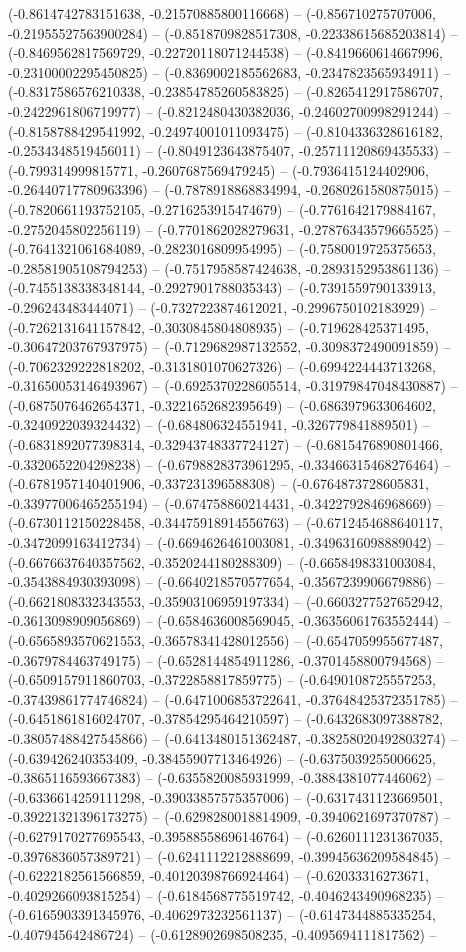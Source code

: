 (-0.8614742783151638, -0.21570885800116668) -- (-0.856710275707006, -0.21955527563900284) -- (-0.8518709828517308, -0.22338615685203814) -- (-0.8469562817569729, -0.22720118071244538) -- (-0.8419660614667996, -0.23100002295450825) -- (-0.8369002185562683, -0.2347823565934911) -- (-0.8317586576210338, -0.23854785260583825) -- (-0.8265412917586707, -0.2422961806719977) -- (-0.8212480430382036, -0.24602700998291244) -- (-0.8158788429541992, -0.24974001011093475) -- (-0.8104336328616182, -0.2534348519456011) -- (-0.8049123643875407, -0.25711120869435533) -- (-0.799314999815771, -0.2607687569479245) -- (-0.7936415124402906, -0.26440717780963396) -- (-0.7878918868834994, -0.2680261580875015) -- (-0.7820661193752105, -0.2716253915474679) -- (-0.7761642179884167, -0.2752045802256119) -- (-0.7701862028279631, -0.27876343579665525) -- (-0.7641321061684089, -0.2823016809954995) -- (-0.7580019725375653, -0.28581905108794253) -- (-0.7517958587424638, -0.2893152953861136) -- (-0.7455138338348144, -0.2927901788035343) -- (-0.7391559790133913, -0.296243483444071) -- (-0.7327223874612021, -0.2996750102183929) -- (-0.7262131641157842, -0.3030845804808935) -- (-0.719628425371495, -0.30647203767937975) -- (-0.7129682987132552, -0.3098372490091859) -- (-0.7062329222818202, -0.3131801070627326) -- (-0.6994224443713268, -0.31650053146493967) -- (-0.6925370228605514, -0.31979847048430887) -- (-0.6875076462654371, -0.3221652682395649) -- (-0.6863979633064602, -0.3240922039324432) -- (-0.684806324551941, -0.326779841889501) -- (-0.6831892077398314, -0.32943748337724127) -- (-0.6815476890801466, -0.3320652204298238) -- (-0.6798828373961295, -0.33466315468276464) -- (-0.6781957140401906, -0.337231396588308) -- (-0.6764873728605831, -0.33977006465255194) -- (-0.674758860214431, -0.3422792846968669) -- (-0.6730112150228458, -0.34475918914556763) -- (-0.6712454688640117, -0.3472099163412734) -- (-0.6694626461003081, -0.3496316098889042) -- (-0.6676637640357562, -0.3520244180288309) -- (-0.6658498331003084, -0.3543884930393098) -- (-0.6640218570577654, -0.3567239906679886) -- (-0.6621808332343553, -0.35903106959197334) -- (-0.6603277527652942, -0.3613098909056869) -- (-0.6584636008569045, -0.36356061763552444) -- (-0.6565893570621553, -0.36578341428012556) -- (-0.6547059955677487, -0.3679784463749175) -- (-0.6528144854911286, -0.3701458800794568) -- (-0.6509157911860703, -0.3722858817859775) -- (-0.6490108725557253, -0.37439861774746824) -- (-0.6471006853722641, -0.37648425372351785) -- (-0.6451861816024707, -0.37854295464210597) -- (-0.6432683097388782, -0.38057488427545866) -- (-0.6413480151362487, -0.38258020492803274) -- (-0.639426240353409, -0.38455907713464926) -- (-0.6375039255006625, -0.3865116593667383) -- (-0.6355820085931999, -0.3884381077446062) -- (-0.6336614259111298, -0.39033857575357006) -- (-0.6317431123669501, -0.39221321396173275) -- (-0.6298280018814909, -0.3940621697370787) -- (-0.6279170277695543, -0.39588558696146764) -- (-0.6260111231367035, -0.3976836057389721) -- (-0.6241112212888699, -0.39945636209584845) -- (-0.6222182561566859, -0.40120398766924464) -- (-0.62033316273671, -0.4029266093815254) -- (-0.6184568775519742, -0.4046243490968235) -- (-0.6165903391345976, -0.4062973232561137) -- (-0.6147344885335254, -0.407945642486724) -- (-0.6128902698508235, -0.4095694111817562) -- 